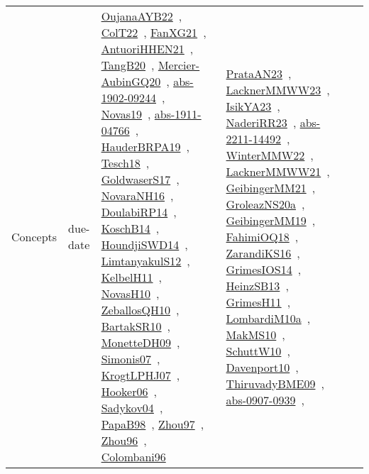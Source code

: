 {\begin{longtable}{lp{3cm}>{\raggedright\arraybackslash}p{6cm}>{\raggedright\arraybackslash}p{6cm}>{\raggedright\arraybackslash}p{8cm}}
Concepts & due-date & \href{papers/OujanaAYB22.pdf}{OujanaAYB22}~\cite{OujanaAYB22}, \href{articles/ColT22.pdf}{ColT22}~\cite{ColT22}, \href{articles/FanXG21.pdf}{FanXG21}~\cite{FanXG21}, \href{papers/AntuoriHHEN21.pdf}{AntuoriHHEN21}~\cite{AntuoriHHEN21}, \href{papers/TangB20.pdf}{TangB20}~\cite{TangB20}, \href{papers/Mercier-AubinGQ20.pdf}{Mercier-AubinGQ20}~\cite{Mercier-AubinGQ20}, \href{articles/abs-1902-09244.pdf}{abs-1902-09244}~\cite{abs-1902-09244}, \href{articles/Novas19.pdf}{Novas19}~\cite{Novas19}, \href{articles/abs-1911-04766.pdf}{abs-1911-04766}~\cite{abs-1911-04766}, \href{articles/HauderBRPA19.pdf}{HauderBRPA19}~\cite{HauderBRPA19}, \href{papers/Tesch18.pdf}{Tesch18}~\cite{Tesch18}, \href{papers/GoldwaserS17.pdf}{GoldwaserS17}~\cite{GoldwaserS17}, \href{articles/NovaraNH16.pdf}{NovaraNH16}~\cite{NovaraNH16}, \href{papers/DoulabiRP14.pdf}{DoulabiRP14}~\cite{DoulabiRP14}, \href{papers/KoschB14.pdf}{KoschB14}~\cite{KoschB14}, \href{papers/HoundjiSWD14.pdf}{HoundjiSWD14}~\cite{HoundjiSWD14}, \href{articles/LimtanyakulS12.pdf}{LimtanyakulS12}~\cite{LimtanyakulS12}, \href{articles/KelbelH11.pdf}{KelbelH11}~\cite{KelbelH11}, \href{articles/NovasH10.pdf}{NovasH10}~\cite{NovasH10}, \href{articles/ZeballosQH10.pdf}{ZeballosQH10}~\cite{ZeballosQH10}, \href{articles/BartakSR10.pdf}{BartakSR10}~\cite{BartakSR10}, \href{papers/MonetteDH09.pdf}{MonetteDH09}~\cite{MonetteDH09}, \href{articles/Simonis07.pdf}{Simonis07}~\cite{Simonis07}, \href{papers/KrogtLPHJ07.pdf}{KrogtLPHJ07}~\cite{KrogtLPHJ07}, \href{articles/Hooker06.pdf}{Hooker06}~\cite{Hooker06}, \href{papers/Sadykov04.pdf}{Sadykov04}~\cite{Sadykov04}, \href{articles/PapaB98.pdf}{PapaB98}~\cite{PapaB98}, \href{articles/Zhou97.pdf}{Zhou97}~\cite{Zhou97}, \href{papers/Zhou96.pdf}{Zhou96}~\cite{Zhou96}, \href{papers/Colombani96.pdf}{Colombani96}~\cite{Colombani96} & \href{articles/PrataAN23.pdf}{PrataAN23}~\cite{PrataAN23}, \href{articles/LacknerMMWW23.pdf}{LacknerMMWW23}~\cite{LacknerMMWW23}, \href{articles/IsikYA23.pdf}{IsikYA23}~\cite{IsikYA23}, \href{articles/NaderiRR23.pdf}{NaderiRR23}~\cite{NaderiRR23}, \href{articles/abs-2211-14492.pdf}{abs-2211-14492}~\cite{abs-2211-14492}, \href{papers/WinterMMW22.pdf}{WinterMMW22}~\cite{WinterMMW22}, \href{papers/LacknerMMWW21.pdf}{LacknerMMWW21}~\cite{LacknerMMWW21}, \href{papers/GeibingerMM21.pdf}{GeibingerMM21}~\cite{GeibingerMM21}, \href{papers/GroleazNS20a.pdf}{GroleazNS20a}~\cite{GroleazNS20a}, \href{papers/GeibingerMM19.pdf}{GeibingerMM19}~\cite{GeibingerMM19}, \href{articles/FahimiOQ18.pdf}{FahimiOQ18}~\cite{FahimiOQ18}, \href{articles/ZarandiKS16.pdf}{ZarandiKS16}~\cite{ZarandiKS16}, \href{articles/GrimesIOS14.pdf}{GrimesIOS14}~\cite{GrimesIOS14}, \href{articles/HeinzSB13.pdf}{HeinzSB13}~\cite{HeinzSB13}, \href{papers/GrimesH11.pdf}{GrimesH11}~\cite{GrimesH11}, \href{articles/LombardiM10a.pdf}{LombardiM10a}~\cite{LombardiM10a}, \href{papers/MakMS10.pdf}{MakMS10}~\cite{MakMS10}, \href{papers/SchuttW10.pdf}{SchuttW10}~\cite{SchuttW10}, \href{papers/Davenport10.pdf}{Davenport10}~\cite{Davenport10}, \href{papers/ThiruvadyBME09.pdf}{ThiruvadyBME09}~\cite{ThiruvadyBME09}, \href{articles/abs-0907-0939.pdf}{abs-0907-0939}~\cite{abs-0907-0939}, 
\end{longtable}}
